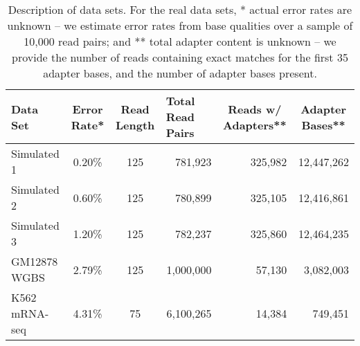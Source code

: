\begin{table}[htbp]
  \centering
    \begin{tabular}{lccrrr}
    Data Set & Error Rate* & Read Length & \multicolumn{1}{l}{Total Read Pairs} & \multicolumn{1}{c}{Reads w/ Adapters**} & \multicolumn{1}{c}{Adapter Bases**} \\
    \midrule
    Simulated 1 & 0.20\% & 125   & 781,923 & 325,982 & 12,447,262 \\
    Simulated 2 & 0.60\% & 125   & 780,899 & 325,105 & 12,416,861 \\
    Simulated 3 & 1.20\% & 125   & 782,237 & 325,860 & 12,464,235 \\
    GM12878 WGBS & 2.79\% & 125 & 1,000,000 & 57,130 & 3,082,003 \\
    K562 mRNA-seq & 4.31\% & 75 & 6,100,265 & 14,384 & 749,451 \\
    \end{tabular}%
    \caption{Description of data sets. For the real data sets, * actual error rates are unknown -- we estimate error rates from base qualities over a sample of 10,000 read pairs; and ** total adapter content is unknown -- we provide the number of reads containing exact matches for the first 35 adapter bases, and the number of adapter bases present.}\label{datasets}%
\end{table}%
